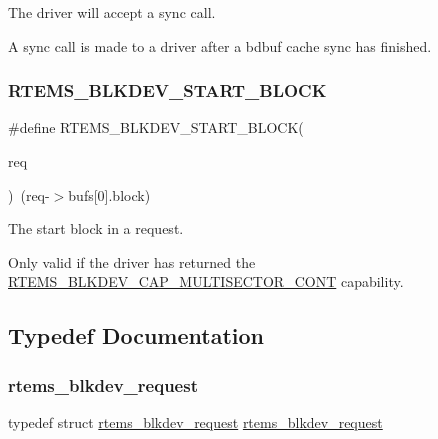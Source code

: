 The driver will accept a sync call. 

A sync call is made to a driver after a bdbuf cache sync has finished. \mbox{\label{group__rtems__blkdev_ga1dd3697d64b56629c38f43b1f5615914}} 
\subsubsection{\texorpdfstring{RTEMS\_BLKDEV\_START\_BLOCK}{RTEMS\_BLKDEV\_START\_BLOCK}}
{\footnotesize\ttfamily \#define R\+T\+E\+M\+S\+\_\+\+B\+L\+K\+D\+E\+V\+\_\+\+S\+T\+A\+R\+T\+\_\+\+B\+L\+O\+CK(\begin{DoxyParamCaption}\item[{}]{req }\end{DoxyParamCaption})~(req-\/$>$bufs\mbox{[}0\mbox{]}.block)}



The start block in a request. 

Only valid if the driver has returned the \mbox{\hyperlink{group__rtems__blkdev_ga25f2de1a9746d8b7d016ae12c51d5328}{R\+T\+E\+M\+S\+\_\+\+B\+L\+K\+D\+E\+V\+\_\+\+C\+A\+P\+\_\+\+M\+U\+L\+T\+I\+S\+E\+C\+T\+O\+R\+\_\+\+C\+O\+NT}} capability. 

\subsection{Typedef Documentation}
\mbox{\label{group__rtems__blkdev_gac77b556344073a161224333b6c605608}} 
\subsubsection{\texorpdfstring{rtems\_blkdev\_request}{rtems\_blkdev\_request}}
{\footnotesize\ttfamily typedef struct \mbox{\hyperlink{structrtems__blkdev__request}{rtems\+\_\+blkdev\+\_\+request}}  \mbox{\hyperlink{structrtems__blkdev__request}{rtems\+\_\+blkdev\+\_\+request}}}



